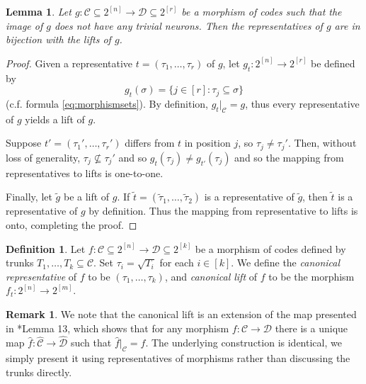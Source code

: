 \documentclass[11pt,letterpaper, reqno]{amsart}
\newtheorem{lem}[thm]{Lemma}         %
\theoremstyle{definition}
\newtheorem{defn}[thm]{Definition}   %
\newtheorem{rmk}[thm]{Remark}
\def\cC{\mathcal{C}}
\def\cD{\mathcal{D}}
\begin{document}
        \begin{lem}
            Let $g: \cC \subseteq 2^{[n]} \to \cD \subseteq 2^{[r]}$ be a morphism of codes such that the image of $g$ does not have any trivial neurons.
            Then the representatives of $g$ are in bijection with the lifts of $g$.
        \end{lem}
        \begin{proof}
            Given a representative $t = (\tau_1,\dots,\tau_r)$ of $g$, let $g_t: 2^{[n]} \to 2^{[r]}$ be defined by
                \[ g_t(\sigma) = \{j \in [r] : \tau_j \subseteq \sigma\}\]
            (c.f. formula \eqref{eq:morphismsets}).
            By definition, $g_t|_\cC = g$,
            thus every representative of $g$ yields a lift of $g$.
            
            Suppose $t' = (\tau_1', \dots,\tau_r')$ differs from $t$ in position $j$, so $\tau_j \neq \tau_j'$.
            Then, without loss of generality, $\tau_j \not\subseteq \tau_j'$ and so $g_t(\tau_j) \neq g_{t'}(\tau_j)$
            and so the mapping from representatives to lifts is one-to-one.

            Finally, let $\tilde{g}$ be a lift of $g$. If $\tilde{t} = (\tilde{\tau}_1, \dots, \tilde{\tau}_2)$ is a representative of $\tilde{g}$, then $\tilde{t}$ is a representative of $g$ by definition.
            Thus the mapping from representative to lifts is onto, completing the proof. 
        \end{proof}

    
        \begin{defn}\label{def:canonicallift}
            Let $f: \cC \subseteq 2^{[n]} \to \cD \subseteq 2^{[k]}$ be a morphism of codes defined by trunks $T_1,\dots, T_k \subseteq \cC$.
            Set $\tau_i = \sqrt{T_i}$ for each $i \in [k]$.
            We define the \emph{canonical representative} of $f$ to be $(\tau_1,\dots,\tau_k)$, and \emph{canonical lift} of $f$ to be the morphism $f_t: 2^{[n]} \to 2^{[m]}$.
        \end{defn}

        \begin{rmk}\label{rmk:hatlift}
            We note that the canonical lift is an extension of the map presented in \cite{jeffs2025coveringrelationsposetcombinatorial}*{Lemma 13}, which shows that for any morphism $f: \cC \to \cD$ there is a unique map $\hat{f}: \widehat{\cC} \to \widehat{\cD}$ such that $\hat{f}|_\cC = f$. The underlying construction is identical, we simply present it using representatives of morphisms rather than discussing the trunks directly. 
        \end{rmk}
        
\end{document}
